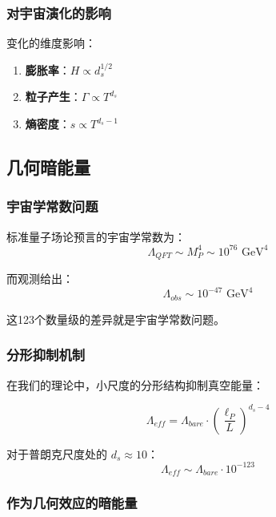 \subsubsection{对宇宙演化的影响}

变化的维度影响：
\begin{enumerate}
    \item \textbf{膨胀率}：$H \propto d_s^{1/2}$
    \item \textbf{粒子产生}：$\Gamma \propto T^{d_s}$
    \item \textbf{熵密度}：$s \propto T^{d_s-1}$
\end{enumerate}

\subsection{几何暗能量}

\subsubsection{宇宙学常数问题}

标准量子场论预言的宇宙学常数为：
\begin{equation}
    \Lambda_{QFT} \sim M_P^4 \sim 10^{76} \text{ GeV}^4
\end{equation}

而观测给出：
\begin{equation}
    \Lambda_{obs} \sim 10^{-47} \text{ GeV}^4
\end{equation}

这123个数量级的差异就是宇宙学常数问题。

\subsubsection{分形抑制机制}

在我们的理论中，小尺度的分形结构抑制真空能量：

\begin{equation}
    \Lambda_{eff} = \Lambda_{bare} \cdot \left(\frac{\ell_P}{L}\right)^{d_s - 4}
\end{equation}

对于普朗克尺度处的 $d_s \approx 10$：
\begin{equation}
    \Lambda_{eff} \sim \Lambda_{bare} \cdot 10^{-123}
\end{equation}

\subsubsection{作为几何效应的暗能量}

